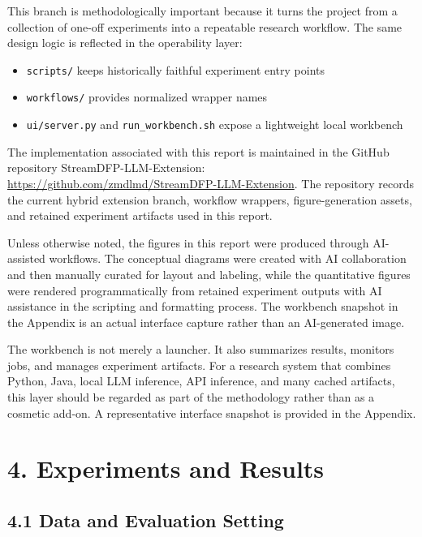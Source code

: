 \documentclass[
  11pt,
  a4paper]{article}
\providecommand{\tightlist}{%
  \setlength{\itemsep}{0pt}\setlength{\parskip}{0pt}}
\begin{document}
This branch is methodologically important because it turns the project
from a collection of one-off experiments into a repeatable research
workflow. The same design logic is reflected in the operability layer:

\begin{itemize}
\tightlist
\item
  \texttt{scripts/} keeps historically faithful experiment entry points
\item
  \texttt{workflows/} provides normalized wrapper names
\item
  \texttt{ui/server.py} and \texttt{run\_workbench.sh} expose a
  lightweight local workbench
\end{itemize}

The implementation associated with this report is maintained in the
GitHub repository StreamDFP-LLM-Extension:
\url{https://github.com/zmdlmd/StreamDFP-LLM-Extension}. The repository
records the current hybrid extension branch, workflow wrappers,
figure-generation assets, and retained experiment artifacts used in this
report.

Unless otherwise noted, the figures in this report were produced through
AI-assisted workflows. The conceptual diagrams were created with AI
collaboration and then manually curated for layout and labeling, while
the quantitative figures were rendered programmatically from retained
experiment outputs with AI assistance in the scripting and formatting
process. The workbench snapshot in the Appendix is an actual interface
capture rather than an AI-generated image.

The workbench is not merely a launcher. It also summarizes results,
monitors jobs, and manages experiment artifacts. For a research system
that combines Python, Java, local LLM inference, API inference, and many
cached artifacts, this layer should be regarded as part of the
methodology rather than as a cosmetic add-on. A representative interface
snapshot is provided in the Appendix.

\hypertarget{experiments-and-results}{%
\section{4. Experiments and Results}\label{experiments-and-results}}

\hypertarget{data-and-evaluation-setting}{%
\subsection{4.1 Data and Evaluation
Setting}\label{data-and-evaluation-setting}}
\end{document}
